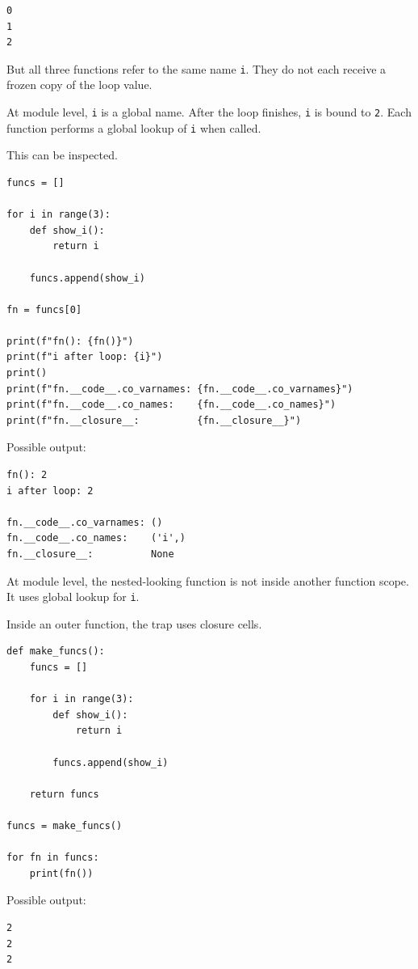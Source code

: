 \begin{verbatim}
0
1
2
\end{verbatim}

But all three functions refer to the same name \texttt{i}. They do not each receive a frozen copy of the loop value.

At module level, \texttt{i} is a global name. After the loop finishes, \texttt{i} is bound to \texttt{2}. Each function performs a global lookup of \texttt{i} when called.

This can be inspected.

\begin{verbatim}
funcs = []

for i in range(3):
    def show_i():
        return i

    funcs.append(show_i)

fn = funcs[0]

print(f"fn(): {fn()}")
print(f"i after loop: {i}")
print()
print(f"fn.__code__.co_varnames: {fn.__code__.co_varnames}")
print(f"fn.__code__.co_names:    {fn.__code__.co_names}")
print(f"fn.__closure__:          {fn.__closure__}")
\end{verbatim}

Possible output:

\begin{verbatim}
fn(): 2
i after loop: 2

fn.__code__.co_varnames: ()
fn.__code__.co_names:    ('i',)
fn.__closure__:          None
\end{verbatim}

At module level, the nested-looking function is not inside another function scope. It uses global lookup for \texttt{i}.

Inside an outer function, the trap uses closure cells.

\begin{verbatim}
def make_funcs():
    funcs = []

    for i in range(3):
        def show_i():
            return i

        funcs.append(show_i)

    return funcs

funcs = make_funcs()

for fn in funcs:
    print(fn())
\end{verbatim}

Possible output:

\begin{verbatim}
2
2
2
\end{verbatim}

